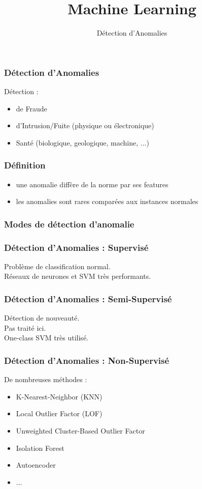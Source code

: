 \documentclass{formation}
\title{Machine Learning}
\subtitle{Détection d'Anomalies}
\begin{document}
\maketitle

\begin{frame}
  \frametitle{Détection d'Anomalies}
  Détection :
  \begin{itemize}
  \item de Fraude
  \item d'Intrusion/Fuite (physique ou électronique)
  \item Santé (biologique, geologique, machine, ...)
  \end{itemize}
\end{frame}

\begin{frame}
  \frametitle{Définition}
  \begin{itemize}
  \item une anomalie diffère de la norme par ses features
  \item les anomalies sont rares comparées aux instances normales
  \end{itemize}
\end{frame}

\begin{frame}
  \frametitle{Modes de détection d'anomalie}
\end{frame}

\begin{frame}
  \frametitle{Détection d'Anomalies : Supervisé}
  Problème de classification normal. \\
  Réseaux de neurones et SVM très performants.
\end{frame}

\begin{frame}
  \frametitle{Détection d'Anomalies : Semi-Supervisé}
  Détection de nouveauté. \\
  Pas traité ici. \\
  One-class SVM très utilisé.
\end{frame}

\begin{frame}
  \frametitle{Détection d'Anomalies : Non-Supervisé}
  De nombreuses méthodes : 
  \begin{itemize}
  \item K-Nearest-Neighbor (KNN)
  \item Local Outlier Factor (LOF)
  \item Unweighted Cluster-Based Outlier Factor
  \item Isolation Forest
  \item Autoencoder
  \item ...
  \end{itemize}
\end{frame}
\end{document}
